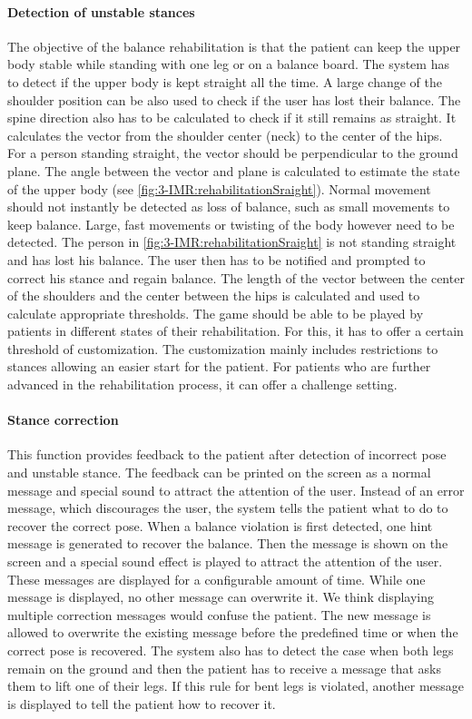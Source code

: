 \paragraph{Detection of unstable stances}
The objective of the balance rehabilitation is that the patient can keep the upper body stable while standing with one leg or on a balance board. The system has to detect if the upper body is kept straight all the time.  A large change of the shoulder position can be also used to check if the user has lost their balance. The spine direction also has to be calculated to check if it still remains as straight.
It calculates the vector from the shoulder center (neck) to the center of the hips. For a person standing straight, the vector should be perpendicular to the ground plane. The angle  between the vector and plane is calculated to estimate the state of the upper body (see \figurename{\ref{fig:3-IMR:rehabilitationSraight}}). 
Normal movement should not instantly be detected as loss of balance, such as small movements to keep balance. Large, fast movements or twisting of the body however need to be detected. The person in \figurename{\ref{fig:3-IMR:rehabilitationSraight}} is not standing straight and has lost his balance. The user then has to be notified and prompted to correct his stance and regain balance.
The length of the vector between the center of the shoulders and the center between the hips is calculated and used to calculate appropriate thresholds. 
The game should be able to be played by patients in different states of their rehabilitation. For this, it has to offer a certain threshold of customization. The customization mainly includes restrictions to stances allowing an easier start for the patient. For patients who are further advanced in the rehabilitation process, it can offer a challenge setting.

\paragraph{Stance correction}
This function provides feedback to the patient after detection of incorrect pose and unstable stance. The feedback can be printed on the screen as a normal message and special sound to attract the attention of the user.
Instead of an error message, which discourages the user, the system tells the patient what to do to recover the correct pose.
When a balance violation is first detected, one hint message is generated to recover the balance. Then the message is shown on the screen and a special sound effect is played to attract the attention of the user. These messages are displayed for a configurable amount of time. While one message is displayed, no other message can overwrite it. We think displaying multiple correction messages would confuse the patient. 
The new message is allowed to overwrite the existing message before the predefined time or when the correct pose is recovered.
The system also has to detect the case when both legs remain on the ground and then the patient has to receive a message that asks them to lift one of their legs. 
If this rule for bent legs is violated, another message is displayed to tell the patient how to recover it.

